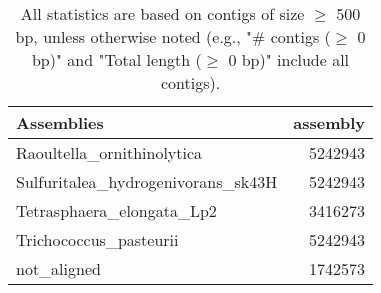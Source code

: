 \documentclass[12pt,a4paper]{article}
\begin{document}
\begin{table}[ht]
\begin{center}
\caption{All statistics are based on contigs of size $\geq$ 500 bp, unless otherwise noted (e.g., "\# contigs ($\geq$ 0 bp)" and "Total length ($\geq$ 0 bp)" include all contigs).}
\begin{tabular}{|l*{1}{|r}|}
\hline
Assemblies & assembly \\ \hline
Raoultella\_ornithinolytica & 5242943 \\ \hline
Sulfuritalea\_hydrogenivorans\_sk43H & 5242943 \\ \hline
Tetrasphaera\_elongata\_Lp2 & 3416273 \\ \hline
Trichococcus\_pasteurii & 5242943 \\ \hline
not\_aligned & 1742573 \\ \hline
\end{tabular}
\end{center}
\end{table}
\end{document}
